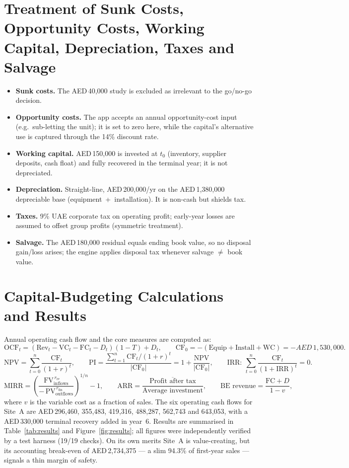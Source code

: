 \documentclass[11pt,a4paper]{article}
\newcommand{\aed}{AED\,}
\begin{document}
\section{Treatment of Sunk Costs, Opportunity Costs, Working Capital, Depreciation, Taxes and Salvage}
\begin{itemize}[leftmargin=1.4em,itemsep=2pt]
\item \textbf{Sunk costs.} The \aed 40{,}000 study is excluded as irrelevant to the go/no-go decision.
\item \textbf{Opportunity costs.} The app accepts an annual opportunity-cost input (e.g.\ sub-letting the unit); it is set to zero here, while the capital's alternative use is captured through the 14\% discount rate.
\item \textbf{Working capital.} \aed 150{,}000 is invested at $t_0$ (inventory, supplier deposits, cash float) and fully recovered in the terminal year; it is not depreciated.
\item \textbf{Depreciation.} Straight-line, \aed 200{,}000/yr on the \aed 1{,}380{,}000 depreciable base (equipment~+~installation). It is non-cash but shields tax.
\item \textbf{Taxes.} 9\% UAE corporate tax on operating profit; early-year losses are assumed to offset group profits (symmetric treatment).
\item \textbf{Salvage.} The \aed 180{,}000 residual equals ending book value, so no disposal gain/loss arises; the engine applies disposal tax whenever salvage $\neq$ book value.
\end{itemize}

\section{Capital-Budgeting Calculations and Results}
Annual operating cash flow and the core measures are computed as:
\[
\text{OCF}_t = (\text{Rev}_t - \text{VC}_t - \text{FC}_t - D_t)(1-T) + D_t,
\qquad
\text{CF}_0 = -(\text{Equip}+\text{Install}+\text{WC}) = -\aed 1{,}530{,}000 .
\]
\[
\text{NPV}=\sum_{t=0}^{n}\frac{\text{CF}_t}{(1+r)^t},
\qquad
\text{PI}=\frac{\sum_{t=1}^{n}\text{CF}_t/(1+r)^t}{|\text{CF}_0|}=1+\frac{\text{NPV}}{|\text{CF}_0|},
\qquad
\text{IRR}:\ \sum_{t=0}^{n}\frac{\text{CF}_t}{(1+\text{IRR})^t}=0 .
\]
\[
\text{MIRR}=\left(\frac{\text{FV}_{\text{inflows}}^{\,r_{\text{re}}}}{-\,\text{PV}_{\text{outflows}}^{\,r_{\text{fin}}}}\right)^{1/n}\!-1,
\qquad
\text{ARR}=\frac{\overline{\text{Profit after tax}}}{\text{Average investment}},
\qquad
\text{BE revenue}=\frac{\text{FC}+D}{1-v},
\]
where $v$ is the variable cost as a fraction of sales. The six operating cash flows for Site~A are \aed 296{,}460, 355{,}483, 419{,}316, 488{,}287, 562{,}743 and 643{,}053, with a \aed 330{,}000 terminal recovery added in year~6. Results are summarised in Table~\ref{tab:results} and Figure~\ref{fig:results}; all figures were independently verified by a test harness (19/19 checks). On its own merits Site~A is value-creating, but its accounting break-even of \aed 2{,}734{,}375 --- a slim 94.3\% of first-year sales --- signals a thin margin of safety.
\end{document}
